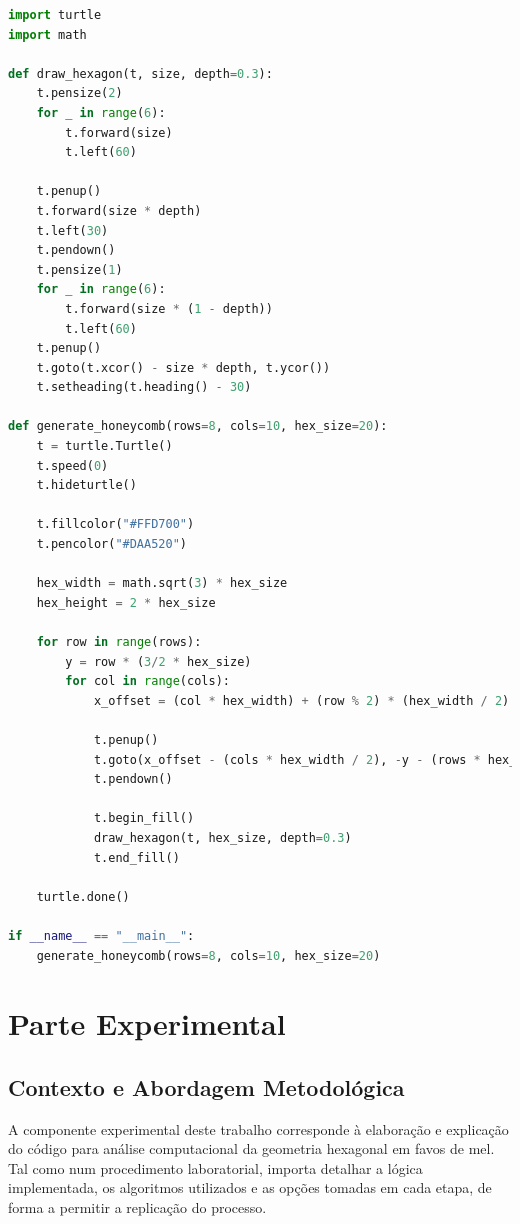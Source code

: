 \documentclass[12pt,a4paper,oneside]{extarticle}
\begin{document}
\begin{lstlisting}[language=python]
import turtle
import math

def draw_hexagon(t, size, depth=0.3):
    t.pensize(2)
    for _ in range(6):
        t.forward(size)
        t.left(60)
    
    t.penup()
    t.forward(size * depth)
    t.left(30)
    t.pendown()
    t.pensize(1)
    for _ in range(6):
        t.forward(size * (1 - depth))
        t.left(60)
    t.penup()
    t.goto(t.xcor() - size * depth, t.ycor())
    t.setheading(t.heading() - 30)

def generate_honeycomb(rows=8, cols=10, hex_size=20):
    t = turtle.Turtle()
    t.speed(0)
    t.hideturtle()
    
    t.fillcolor("#FFD700")
    t.pencolor("#DAA520")
    
    hex_width = math.sqrt(3) * hex_size
    hex_height = 2 * hex_size
    
    for row in range(rows):
        y = row * (3/2 * hex_size)
        for col in range(cols):
            x_offset = (col * hex_width) + (row % 2) * (hex_width / 2)
            
            t.penup()
            t.goto(x_offset - (cols * hex_width / 2), -y - (rows * hex_height / 4))
            t.pendown()
        
            t.begin_fill()
            draw_hexagon(t, hex_size, depth=0.3)
            t.end_fill()
    
    turtle.done()

if __name__ == "__main__":
    generate_honeycomb(rows=8, cols=10, hex_size=20)
\end{lstlisting}


\section{Parte Experimental}

\subsection{Contexto e Abordagem Metodológica}

A componente experimental deste trabalho corresponde à elaboração e explicação do código para análise computacional da geometria hexagonal em favos de mel. Tal como num procedimento laboratorial, importa detalhar a lógica implementada, os algoritmos utilizados e as opções tomadas em cada etapa, de forma a permitir a replicação do processo.
\end{document}
